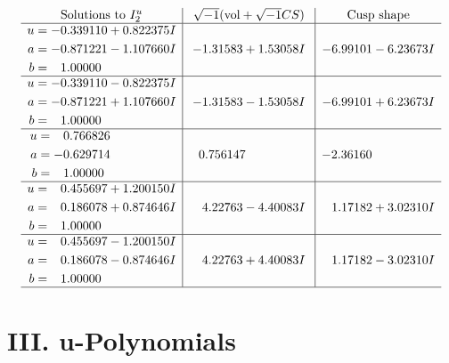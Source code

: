 \documentclass[1p]{elsarticle_modified}
\theoremstyle{definition}
\newcommand{\I}{\sqrt{-1}}
\begin{document}
$$\begin{array}{c|c|c}  
\text{Solutions to }I^u_{2}& \I (\text{vol} + \sqrt{-1}CS) & \text{Cusp shape}\\
 \hline 
\begin{aligned}
u &= -0.339110 + 0.822375 I \\
a &= -0.871221 - 1.107660 I \\
b &= \phantom{-}1.00000\phantom{ +0.000000I}\end{aligned}
 & -1.31583 + 1.53058 I & -6.99101 - 6.23673 I \\ \hline\begin{aligned}
u &= -0.339110 - 0.822375 I \\
a &= -0.871221 + 1.107660 I \\
b &= \phantom{-}1.00000\phantom{ +0.000000I}\end{aligned}
 & -1.31583 - 1.53058 I & -6.99101 + 6.23673 I \\ \hline\begin{aligned}
u &= \phantom{-}0.766826\phantom{ +0.000000I} \\
a &= -0.629714\phantom{ +0.000000I} \\
b &= \phantom{-}1.00000\phantom{ +0.000000I}\end{aligned}
 & \phantom{-}0.756147\phantom{ +0.000000I} & -2.36160\phantom{ +0.000000I} \\ \hline\begin{aligned}
u &= \phantom{-}0.455697 + 1.200150 I \\
a &= \phantom{-}0.186078 + 0.874646 I \\
b &= \phantom{-}1.00000\phantom{ +0.000000I}\end{aligned}
 & \phantom{-}4.22763 - 4.40083 I & \phantom{-}1.17182 + 3.02310 I \\ \hline\begin{aligned}
u &= \phantom{-}0.455697 - 1.200150 I \\
a &= \phantom{-}0.186078 - 0.874646 I \\
b &= \phantom{-}1.00000\phantom{ +0.000000I}\end{aligned}
 & \phantom{-}4.22763 + 4.40083 I & \phantom{-}1.17182 - 3.02310 I\\
 \hline 
 \end{array}$$\newpage
\newpage\renewcommand{\arraystretch}{1}
\centering \section*{ III. u-Polynomials}
\end{document}
